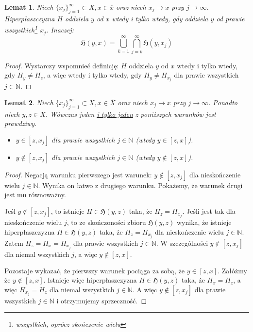 \documentclass[licencjacka]{pracamgr}
\theoremstyle{definition}
\theoremstyle{definition}
\theoremstyle{definition}
\theoremstyle{definition}
\theoremstyle{definition}
\theoremstyle{plain}
\newtheorem{lemma}{Lemat}[section]
\theoremstyle{plain}
\begin{document}
\begin{lemma}
	Niech $ \{x_j\}_{j = 1}^{\infty} \subset X, x \in \overline{x} $ oraz niech 
	$ x_j \rightarrow x$ przy $ j \rightarrow \infty $. Hiperpłaszczyzna $ H $ 
	oddziela $ y $ od $ x $ wtedy i tylko wtedy, gdy oddziela $ y $ od prawie 
	wszystkich\footnote{wszystkich, oprócz skończenie wielu} $ x_j $. Inaczej:
	$$ \mathfrak{H}(y,x) = \bigcup\limits_{k = 1}^{\infty} \bigcap\limits_{j = k}^{\infty}
	\mathfrak{H}(y,x_j) $$
\end{lemma}
\begin{proof}
	Wystarczy wspomnieć definicję: $ H $ oddziela $ y $ od $ x $ wtedy i tylko wtedy, gdy 
	$ H_y \neq H_z $, a więc wtedy i tylko wtedy, gdy $H_y \neq H_{x_j} $ dla prawie 
	wszystkich $ j \in \mathbb{N} $. 
\end{proof}
\begin{lemma}
	Niech $ \{x_j\}_{j = 1}^{\infty} \subset X, x \in \overline{X} $ oraz niech 
	$ x_j \rightarrow x$ przy $ j \rightarrow \infty $. Ponadto niech $ y,z \in X $. 
	Wówczas jeden \underline{i tylko jeden} z poniższych warunków jest prawdziwy.
	\begin{itemize}
		\item $ y \in [z,x_j] $ dla prawie wszystkich $ j \in \mathbb{N} $
		(wtedy $ y \in [z,x]$).
		\item $ y \notin [z,x_j] $ dla prawie wszystkich $ j \in \mathbb{N} $
		(wtedy $ y \notin [z,x] $).
	\end{itemize}
\end{lemma}
\begin{proof}
	Negacją warunku pierwszego jest warunek: $ y \notin [z,x_j] $ dla nieskończenie 
	wielu $ j \in \mathbb{N} $. Wynika on łatwo z drugiego warunku. Pokażemy, że warunek 
	drugi jest mu równoważny.
	
	Jeśl $ y \notin [z,x_j]  $, to istnieje $ H \in \mathfrak{H}(y,z) $ taka, że 
	$ H_z = H_{x_j} $. %
	Jeśli jest tak dla nieskończenie wielu $ j $, to ze skończoności zbioru 
	$ \mathfrak{H}(y,z) $ wynika, że istnieje hiperpłaszczyzna 
	$ H \in \mathfrak{H}(y,z)$ taka, że $ H_{z} = H_{x_j} $ dla nieskończenie wielu $ j \in 
	\mathbb{N} $. Zatem $ H_z = H_x = H_{x_j} $ dla prawie wszystkich $ j \in \mathbb{N} $. 
	W szczególności $ y \notin [z,x_j] $ dla niemal wszystkich $ j $, a więc 
	$ y \notin [z,x] $.
	
	Pozostaje wykazać, że pierwszy warunek pociąga za sobą, że $ y \in [z,x] $.
	Załóżmy że $ y \notin [z,x] $. Istnieje więc hiperpłaszczyzna  
	$ H \in \mathfrak{H}(y,z) $ taka, że $ H_x = H_z $, a więc $ H_{x_j} = H_{z} $ dla 
	niemal wszystkich $ j \in \mathbb{N} $. A więc $ y \notin [z,x_j] $ dla 
	prawie wszystkich $ j \in \mathbb{N} $ i otrzymujemy sprzeczność.
\end{proof}
\end{document}
